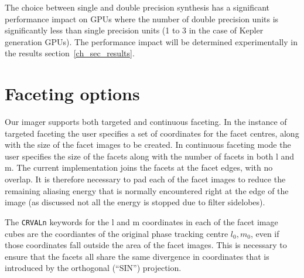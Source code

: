 The choice between single and double precision synthesis has a significant performance impact on GPUs where the number of double precision units is significantly
less than single precision units (1 to 3 in the case of Kepler generation GPUs). The performance impact will be determined experimentally in the results 
section~\ref{ch_sec_results}.
\section{Faceting options}
Our imager supports both targeted and continuous faceting. In the instance of targeted faceting the user specifies a set of coordinates 
for the facet centres, along with the size of the facet images to be created. In continuous faceting mode the user specifies the size of the facets along with the number of facets in
both l and m. The current implementation joins the facets at the facet edges, with no overlap. It is therefore necessary to pad each of the facet images to
reduce the remaining aliasing energy that is normally encountered right at the edge of the image (as discussed not all the energy is stopped due to filter sidelobes).

The \texttt{CRVALn} keywords for the l and m coordinates in each of the facet image cubes are the coordiantes of the original phase tracking centre $l_0,m_0$, even
if those coordinates fall outside the area of the facet images. This is necessary to ensure that the facets all share the same divergence in coordinates that is introduced by the
orthogonal (``SIN'') projection.

